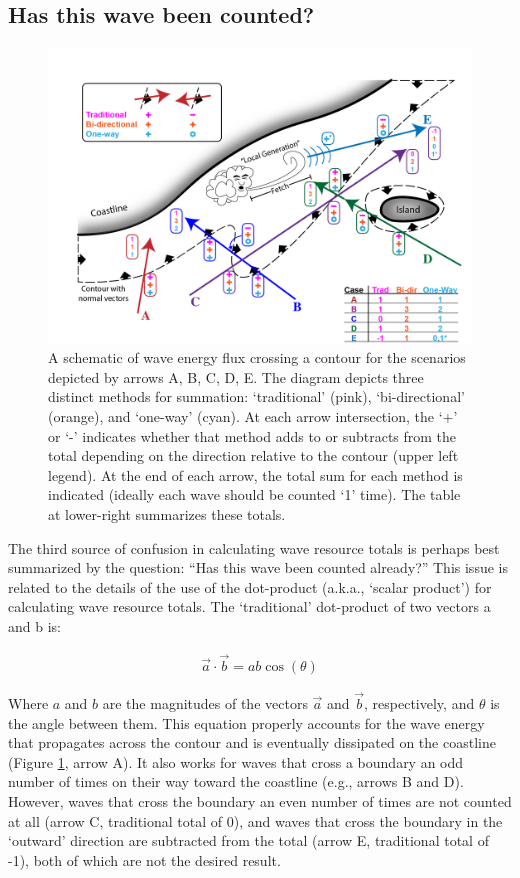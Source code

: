 \documentclass[authoryear,preprint]{elsarticle}
\begin{document}
\subsection{Has this wave been counted?}

\begin{figure}[ht]
  \centering
  \includegraphics[width=\linewidth]{../diagram/schematic03.png}
  \caption{A schematic of wave energy flux crossing a contour for the scenarios depicted by arrows A, B, C, D, E. The diagram depicts three distinct methods for summation: ‘traditional’ (pink), ‘bi-directional’ (orange), and ‘one-way’ (cyan). At each arrow intersection, the ‘+’ or ‘-’ indicates whether that method adds to or subtracts from the total depending on the direction relative to the contour (upper left legend). At the end of each arrow, the total sum for each method is indicated (ideally each wave should be counted ‘1’ time). The table at lower-right summarizes these totals.}
  \label{fig:wave-counting}
\end{figure}

The third source of confusion in calculating wave resource totals is perhaps best summarized by the question: “Has this wave been counted already?” This issue is related to the details of the use of the dot-product (a.k.a., ‘scalar product’) for calculating wave resource totals. The ‘traditional’ dot-product of two vectors a and b is:

\begin{align}
  \vec{a} \cdot \vec{b} = a b \cos(\theta)
\end{align}

Where $a$ and $b$ are the magnitudes of the vectors $\vec{a}$ and $\vec{b}$, respectively, and $\theta$ is the angle between them. This equation properly accounts for the wave energy that propagates across the contour and is eventually dissipated on the coastline (Figure \ref{fig:wave-counting}, arrow A). It also works for waves that cross a boundary an odd number of times on their way toward the coastline (e.g., arrows B and D). However, waves that cross the boundary an even number of times are not counted at all (arrow C, traditional total of 0), and waves that cross the boundary in the ‘outward’ direction are subtracted from the total (arrow E, traditional total of -1), both of which are not the desired result.
\end{document}

